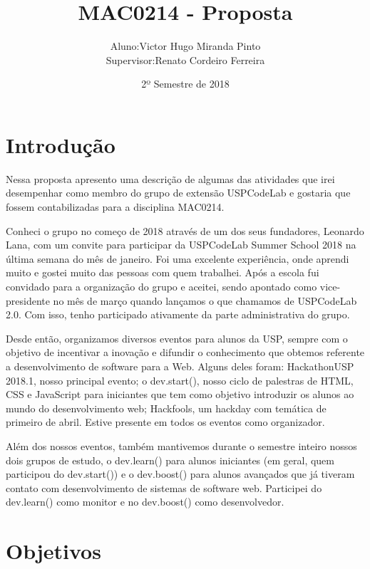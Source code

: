 \documentclass[10pt,twoside,a4paper]{article}
\title{MAC0214 - Proposta}
\author{
  \begin{tabular}{rl}
    Aluno:      & Victor Hugo Miranda Pinto \\
    Supervisor: & Renato Cordeiro Ferreira
  \end{tabular}
}
\date{2º Semestre de 2018}
\begin{document}
\maketitle

\section{Introdução}

  Nessa proposta apresento uma descrição de algumas das atividades que irei desempenhar como membro do grupo de extensão USPCodeLab e gostaria que fossem contabilizadas para a disciplina MAC0214.
  
  Conheci o grupo no começo de 2018 através de um dos seus fundadores, Leonardo Lana, com um convite para participar da USPCodeLab Summer School 2018 na última semana do mês de janeiro. Foi uma excelente experiência, onde aprendi muito e gostei muito das pessoas com quem trabalhei. Após a escola fui convidado para a organização do grupo e aceitei, sendo apontado como vice-presidente no mês de março quando lançamos o que chamamos de USPCodeLab 2.0. Com isso, tenho participado ativamente da parte administrativa do grupo.
  
  Desde então, organizamos diversos eventos para alunos da USP, sempre com o objetivo de incentivar a inovação e difundir o conhecimento que obtemos referente a desenvolvimento de software para a Web. Alguns deles foram: HackathonUSP 2018.1, nosso principal evento; o dev.start(), nosso ciclo de palestras de HTML, CSS e JavaScript para iniciantes que tem como objetivo introduzir os alunos ao mundo do desenvolvimento web; Hackfools, um hackday com temática de primeiro de abril. Estive presente em todos os eventos como organizador.
  
  Além dos nossos eventos, também mantivemos durante o semestre inteiro nossos dois grupos de estudo, o dev.learn() para alunos iniciantes (em geral, quem participou do dev.start()) e o dev.boost() para alunos avançados que já tiveram contato com desenvolvimento de sistemas de software web. Participei do dev.learn() como monitor e no dev.boost() como desenvolvedor.


\section{Objetivos}
\end{document}
